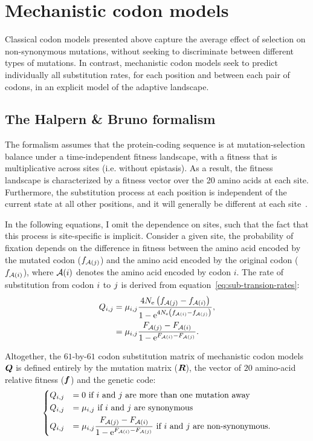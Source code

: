 \section{Mechanistic {codon} models}
\label{sec:intro-mechanistic-codon-models}

Classical codon models presented above capture the average effect of selection on non-synonymous mutations, without seeking to discriminate between different types of mutations.
In contrast, mechanistic codon models seek to predict individually all substitution rates, for each position and between each pair of codons, in an explicit model of the adaptive landscape.

\subsection{The Halpern \& Bruno formalism}
\label{subsec:HB-formalism}

The \citet{Halpern1998} formalism assumes that the protein-coding sequence is at mutation-selection balance under a time-independent fitness landscape, with a fitness that is multiplicative across sites (i.e. without epistasis).
As a result, the fitness landscape is characterized by a fitness vector over the 20 amino acids at each site.
Furthermore, the substitution process at each position is independent of the current state at all other positions, and it will generally be different at each site~\citep{Rodrigue2010, Tamuri2012}.

In the following equations, I omit the dependence on sites, such that the fact that this process is site-specific is implicit.
Consider a given site, the probability of fixation depends on the difference in fitness between the amino acid encoded by the mutated codon ($f_{\mathcal{A}({j})}$) and the amino acid encoded by the original codon ($f_{\mathcal{A}({i})}$), where $\mathcal{A}({i})$ denotes the amino acid encoded by codon $i$.
The rate of substitution from codon ${i}$ to ${j}$ is derived from equation~\ref{eq:sub-transion-rates}:
\begin{align}
    Q_{{i}, {j}} & = \mu_{{i}, {j}} \dfrac{4 N_{\text{e}} \left({f_{\mathcal{A}({j})} - f_{\mathcal{A}({i})}}\right)}{{1 - \text{e}^{4 N_{\text{e}} \left({f_{\mathcal{A}({i})} - f_{\mathcal{A}({j})}}\right)} }}, \\
    & = \mu_{{i}, {j}} \dfrac{F_{\mathcal{A}({j})} - F_{\mathcal{A}({i})}}{1 - \text{e}^{F_{\mathcal{A}({i})} - F_{\mathcal{A}({j})}} }.
\end{align}

Altogether, the $61$-by-$61$ codon substitution matrix of mechanistic codon models $\bm{Q}$ is defined entirely by the mutation matrix ($\bm{R}$), the vector of $20$ amino-acid relative fitness ($\bm{f}$) and the genetic code:
\begin{equation}
    \begin{dcases}
        Q_{{i}, {j}} & = 0 \text{ if ${i}$ and ${j}$ are more than one mutation away} \\
        Q_{{i}, {j}} & = \mu_{{i}, {j}} \text{ if ${i}$ and ${j}$ are synonymous} \\
        Q_{{i}, {j}} & = \mu_{{i}, {j}} \dfrac{F_{\mathcal{A}({j})} - F_{\mathcal{A}({i})}}{1 - \text{e}^{F_{\mathcal{A}({i})} - F_{\mathcal{A}({j})}} } \text{ if ${i}$ and ${j}$ are non-synonymous}.
    \end{dcases}
    \label{eq:propensities-models}
\end{equation}

